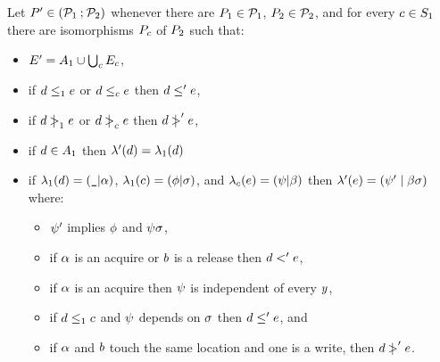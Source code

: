 \begin{definition}
  \label{def:seq}
  Let $P' \in (\mathcal{P}_1 \mathbin; \mathcal{P}_2)$ whenever there are
  $P_1 \in \mathcal{P}_1$, $P_2 \in \mathcal{P}_2$, and for every $c\in S_1$
  there are isomorphisms $P_{c}$ of $P_2$ such that:
\begin{itemize}
\item $E' = A_1 \cup \bigcup_{c}E_{c}$,
\item if $d \le_1 e$ or $d\le_{c} e$ then $d \le' e$,
\item if $d \mathrel{\,\mid\!\!\!>}_1 e$ or $d\mathrel{\,\mid\!\!\!>}_{c} e$ then $d \mathrel{\,\mid\!\!\!>}' e$,
\item if $d\in A_1$ then $\lambda'(d) = \lambda_1(d)$
\item if
  $\lambda_1(d) = (\texttt{\_} {\mid} \alpha)$,
  $\lambda_1(c) = (\phi {\mid} \sigma)$, and
  $\lambda_{c}(e) = (\psi {\mid} \beta)$ then
  $\lambda'(e) = (\psi' \mid \beta\sigma)$ where:
  \begin{itemize}
  \item $\psi'$ implies $\phi$ and $\psi\sigma$,
  \item if $\alpha$ is an acquire or $b$ is a release then $d <' e$,
  \item if $\alpha$ is an acquire then $\psi$ is independent of every $y$,
  \item if $d \le_1 c$ and $\psi$ depends on $\sigma$ then $d \le'
    e$, and
  \item if $\alpha$ and $b$ touch the same location and one is a write,
    then $d \mathrel{\,\mid\!\!\!>}' e$.
  \end{itemize}
\end{itemize}
\end{definition}

\newpage

